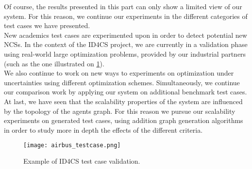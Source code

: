 Of course, the results presented in this part can only show a limited view of our system. For this reason, we continue our experiments in the different categories of test cases we have presented.\\
New academics test cases are experimented upon in order to detect potential new NCSs. In the context of the ID4CS project, we are currently in a validation phase using real-world large optimization problems, provided by our industrial partners (such as the one illustrated on \figurename{} \ref{test_case_airbus}).\\
We also continue to work on new ways to experiments on optimization under uncertainties using different optimization schemes. Simultaneously, we continue our comparison work by applying our system on additional benchmark test cases.\\
At last, we have seen that the scalability properties of the system are influenced by the topology of the agents graph. For this reason we pursue our scalability experiments on generated test cases, using addition graph generation algorithms in order to study more in depth the effects of the different criteria.

\begin{figure}[b]
\centering
\texttt{[image: airbus\_testcase.png]}
\caption{Example of ID4CS test case validation.}\label{test_case_airbus}
\end{figure}